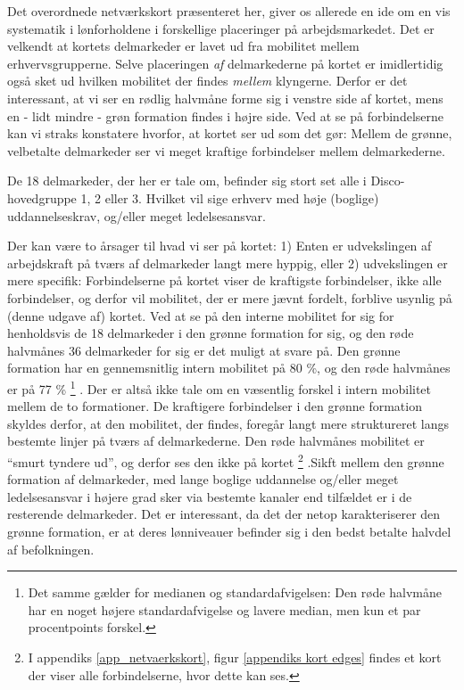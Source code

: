 Det overordnede netværkskort præsenteret her, giver os allerede en ide om en vis systematik i lønforholdene i forskellige placeringer på arbejdsmarkedet. Det er velkendt at kortets delmarkeder er lavet ud fra mobilitet mellem erhvervsgrupperne. Selve placeringen \emph{af} delmarkederne på kortet er imidlertidig også sket ud hvilken mobilitet der findes \emph{mellem} klyngerne. Derfor er det interessant, at vi ser en rødlig halvmåne forme sig i venstre side af kortet, mens en - lidt mindre - grøn formation findes i højre side. Ved at se på forbindelserne kan vi straks konstatere hvorfor, at kortet ser ud som det gør: Mellem de grønne, velbetalte delmarkeder ser vi meget kraftige forbindelser mellem delmarkederne. 

De 18 delmarkeder, der her er tale om, befinder sig stort set alle i Disco-hovedgruppe 1, 2 eller 3. Hvilket vil sige erhverv med høje (boglige) uddannelseskrav, og/eller meget ledelsesansvar. 

Der kan være to årsager til hvad vi ser på kortet: 1) Enten er udvekslingen af arbejdskraft på tværs af delmarkeder langt mere hyppig, eller 2) udvekslingen er mere specifik: Forbindelserne på kortet viser de kraftigste forbindelser, ikke alle forbindelser, og derfor vil mobilitet, der er mere jævnt fordelt, forblive usynlig på (denne udgave af) kortet. Ved at se på den interne mobilitet for sig for henholdsvis de 18 delmarkeder i den grønne formation for sig, og den røde halvmånes 36 delmarkeder for sig er det muligt at svare på. Den grønne formation har en gennemsnitlig intern mobilitet på 80 \%, og den røde halvmånes er på 77 \%%
%
  \footnote{ Det samme gælder for medianen og standardafvigelsen: Den røde halvmåne har en noget højere standardafvigelse og lavere median, men kun et par procentpoints forskel.}%
%
. Der er altså ikke tale om en væsentlig forskel i intern mobilitet mellem de to formationer. De kraftigere forbindelser i den grønne formation skyldes derfor, at den mobilitet, der findes, foregår langt mere struktureret langs bestemte linjer på tværs af delmarkederne. Den røde halvmånes mobilitet er “smurt tyndere ud”, og derfor ses den ikke på kortet%
%
 \footnote{ I appendiks \ref{app_netvaerkskort}, figur \ref{appendiks kort edges} findes et kort der viser alle forbindelserne, hvor dette kan ses.}%
%
.Sikft mellem den grønne formation af delmarkeder, med lange boglige uddannelse og/eller meget ledelsesansvar i højere grad sker via bestemte kanaler end tilfældet er i de resterende delmarkeder. Det er interessant, da det der netop karakteriserer den grønne formation, er at deres lønniveauer befinder sig i den bedst betalte halvdel af befolkningen. 


